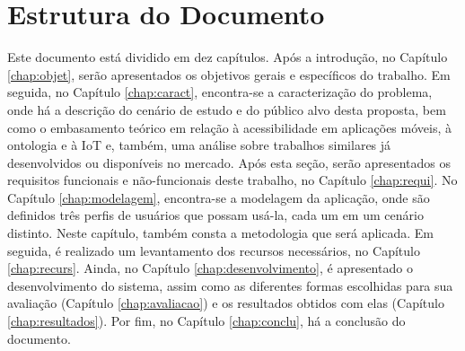 \section{Estrutura do Documento}
Este documento está dividido em dez capítulos. Após a introdução, no Capítulo \ref{chap:objet}, serão apresentados os objetivos gerais e específicos do trabalho. Em seguida, no Capítulo \ref{chap:caract}, encontra-se a caracterização do problema, onde há a descrição do cenário de estudo e do público alvo desta proposta, bem como o embasamento teórico em relação à acessibilidade em aplicações móveis, à ontologia e à IoT e, também, uma análise sobre trabalhos similares já desenvolvidos ou disponíveis no mercado. Após esta seção, serão apresentados os requisitos funcionais e não-funcionais deste trabalho, no Capítulo \ref{chap:requi}. No Capítulo \ref{chap:modelagem}, encontra-se a modelagem da aplicação, onde são definidos três perfis de usuários que possam usá-la, cada um em um cenário distinto. Neste capítulo, também consta a metodologia que será aplicada. Em seguida, é realizado um levantamento dos recursos necessários, no Capítulo \ref{chap:recurs}. Ainda, no Capítulo \ref{chap:desenvolvimento}, é apresentado o desenvolvimento do sistema, assim como as diferentes formas escolhidas para sua avaliação (Capítulo \ref{chap:avaliacao}) e os resultados obtidos com elas (Capítulo \ref{chap:resultados}). Por fim, no Capítulo \ref{chap:conclu}, há a conclusão do documento.